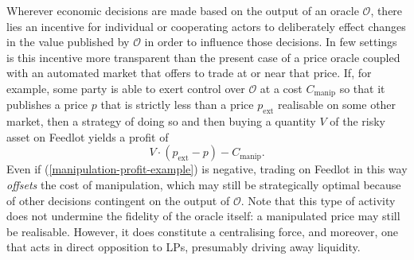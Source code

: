 \documentclass[a4paper,10pt]{article}
\theoremstyle{remark}
\newcommand \oracle {\mathcal{O}}
\begin{document}
Wherever economic decisions are made based on the output of an oracle $\mathcal{O}$, there lies an incentive for individual or cooperating actors to deliberately effect changes in the value published by $\mathcal{O}$ in order to influence those decisions. 
%
In few settings is this incentive more transparent than the present case of a price oracle coupled with an automated market that offers to trade at or near that price.
%
If, for example, some party is able to exert control over $\mathcal{O}$ at a cost $C_\mathrm{manip}$ so that it publishes a price $p$ that is strictly less than a price $p_\mathrm{ext}$ realisable on some other market, then a strategy of doing so and then buying a quantity $V$ of the risky asset on Feedlot yields a profit of
\begin{equation}
\label{manipulation-profit-example}
  V\cdot (p_\mathrm{ext}-p) - C_\mathrm{manip}.
\end{equation}
Even if (\ref{manipulation-profit-example}) is negative, trading on Feedlot in this way \emph{offsets} the cost of manipulation, which may still be strategically optimal because of other decisions contingent on the output of $\oracle$.
%
Note that this type of activity does not undermine the fidelity of the oracle itself: a manipulated price may still be realisable.
%
However, it does constitute a centralising force, and moreover, one that acts in direct opposition to LPs, presumably driving away liquidity.

\end{document}
